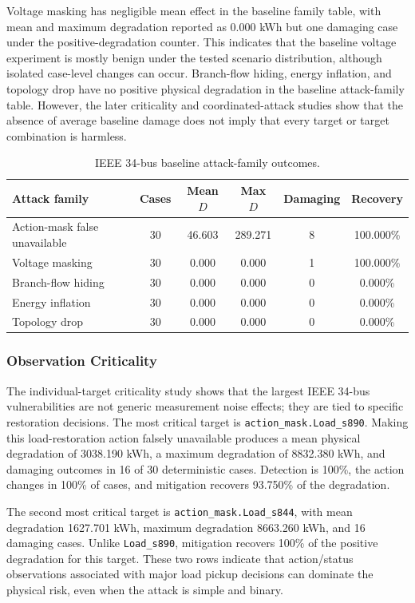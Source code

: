 Voltage masking has negligible mean effect in the baseline family table, with mean and maximum degradation reported as 0.000 kWh but one damaging case under the positive-degradation counter. This indicates that the baseline voltage experiment is mostly benign under the tested scenario distribution, although isolated case-level changes can occur. Branch-flow hiding, energy inflation, and topology drop have no positive physical degradation in the baseline attack-family table. However, the later criticality and coordinated-attack studies show that the absence of average baseline damage does not imply that every target or target combination is harmless.

\begin{table}[t]
\centering
\caption{IEEE 34-bus baseline attack-family outcomes.}
\label{tab:ieee34_attack_family}
\scriptsize
\begin{tabular}{lccccc}
\hline
Attack family & Cases & Mean $D$ & Max $D$ & Damaging & Recovery \\
\hline
Action-mask false unavailable & 30 & 46.603 & 289.271 & 8 & 100.000\% \\
Voltage masking & 30 & 0.000 & 0.000 & 1 & 100.000\% \\
Branch-flow hiding & 30 & 0.000 & 0.000 & 0 & 0.000\% \\
Energy inflation & 30 & 0.000 & 0.000 & 0 & 0.000\% \\
Topology drop & 30 & 0.000 & 0.000 & 0 & 0.000\% \\
\hline
\end{tabular}
\end{table}

\subsubsection{Observation Criticality}
\label{subsubsec:ieee34_criticality}

The individual-target criticality study shows that the largest IEEE 34-bus vulnerabilities are not generic measurement noise effects; they are tied to specific restoration decisions. The most critical target is \texttt{action\_mask.Load\_s890}. Making this load-restoration action falsely unavailable produces a mean physical degradation of 3038.190 kWh, a maximum degradation of 8832.380 kWh, and damaging outcomes in 16 of 30 deterministic cases. Detection is 100\%, the action changes in 100\% of cases, and mitigation recovers 93.750\% of the degradation.

The second most critical target is \texttt{action\_mask.Load\_s844}, with mean degradation 1627.701 kWh, maximum degradation 8663.260 kWh, and 16 damaging cases. Unlike \texttt{Load\_s890}, mitigation recovers 100\% of the positive degradation for this target. These two rows indicate that action/status observations associated with major load pickup decisions can dominate the physical risk, even when the attack is simple and binary.

